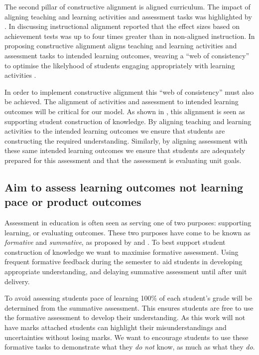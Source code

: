The second pillar of constructive alignment is aligned curriculum. The impact of aligning teaching and learning activities and assessment tasks was highlighted by \citet{Cohen:1987}. In discussing instructional alignment \citet{Cohen:1987} reported that the effect sizes based on achievement tests was up to four times greater than in non-aligned instruction. In proposing constructive alignment \citet{Biggs:1996c} aligns teaching and learning activities and assessment tasks to intended learning outcomes, weaving a ``web of consistency'' to optimise the likelyhood of students engaging appropriately with learning activities \cite{Biggs:1999}. 

In order to implement constructive alignment this ``web of consistency'' must also be achieved. The alignment of activities and assessment to intended learning outcomes will be critical for our model. As shown in , this alignment is seen as supporting student construction of knowledge. By aligning teaching and learning activities to the intended learning outcomes we ensure that students are constructing the required understanding. Similarly, by aligning assessment with these same intended learning outcomes we ensure that students are adequately prepared for this assessment and that the assessment is evaluating unit goals. 



\subsection{Aim to assess learning outcomes not learning pace or product outcomes} %
\label{ssub:aim_to_assess_learning_outcomes_not_learning_pace_or_product_outcomes_}

Assessment in education is often seen as serving one of two purposes: supporting learning, or evaluating outcomes. These two purposes have come to be known as \emph{formative} and \emph{summative}, as proposed by \citet{Scriven:1967} and \citet{Bloom:1969}. To best support student construction of knowledge we want to maximise formative assessment. Using frequent formative feedback during the semester to aid students in developing appropriate understanding, and delaying summative assessment until after unit delivery.

To avoid assessing students pace of learning 100\% of each student's grade will be determined from the summative assessment. This ensures students are free to use the formative assessment to develop their understanding. As this work will not have marks attached students can highlight their misunderstandings and uncertainties without losing marks. We want to encourage students to use these formative tasks to demonstrate what they \emph{do not} know, as much as what they \emph{do}. 

